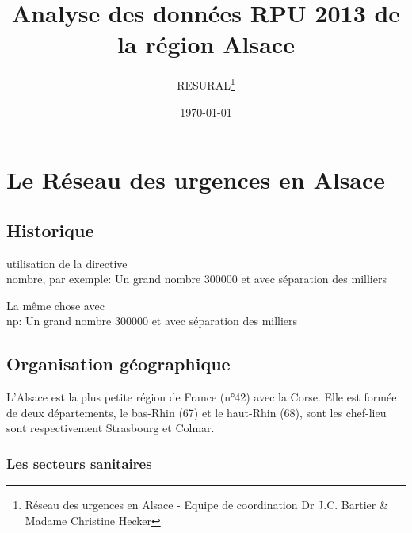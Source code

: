 \documentclass[12pt,english,french]{report}\usepackage{graphicx, color}
\makeatletter
\newenvironment{kframe}{%
 \def\at@end@of@kframe{}%
 \ifinner\ifhmode%
  \def\at@end@of@kframe{\end{minipage}}%
  \begin{minipage}{\columnwidth}%
 \fi\fi%
 \def\FrameCommand##1{\hskip\@totalleftmargin \hskip-\fboxsep
 \colorbox{shadecolor}{##1}\hskip-\fboxsep
     \hskip-\linewidth \hskip-\@totalleftmargin \hskip\columnwidth}%
 \MakeFramed {\advance\hsize-\width
   \@totalleftmargin\z@ \linewidth\hsize
   \@setminipage}}%
 {\par\unskip\endMakeFramed%
 \at@end@of@kframe}
\newenvironment{knitrout}{}{} %
\makeatother
\begin{document}
\title{Analyse des données RPU 2013 de la région Alsace}
\author{RESURAL\thanks{Réseau des urgences en Alsace - Equipe de coordination Dr J.C.
Bartier \& Madame Christine Hecker}}
\date{\today}
\maketitle


\tableofcontents
\listoftables
\listoffigures

\begin{knitrout}
\color{fgcolor}\begin{kframe}


{\ttfamily\noindent\bfseries\color{errorcolor}{\#\# Error: there is no package called 'stargazer'}}\end{kframe}
\end{knitrout}

\part{Le Réseau des urgences en Alsace}
\chapter{Historique}
utilisation de la directive \\nombre{}, par exemple: 
Un grand nombre 300000 et avec séparation des milliers 

La même chose avec \\np{}: 
Un grand nombre 300000 et avec séparation des milliers 

\chapter{Organisation géographique}


L'Alsace est la plus petite région de France (n°42) avec la Corse. Elle est formée de deux départements, le bas-Rhin (67) et le haut-Rhin (68), sont les chef-lieu sont respectivement Strasbourg et Colmar.

\section{Les secteurs sanitaires}
\end{document}

